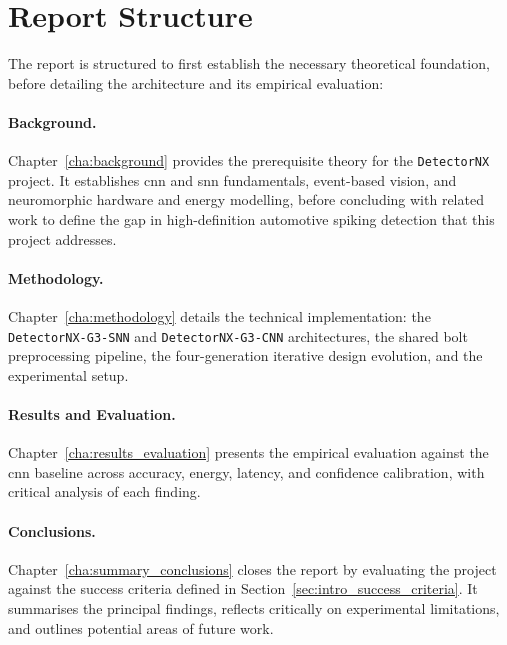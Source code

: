 \section{Report Structure}
\label{sec:intro_report_structure}

The report is structured to first establish the necessary theoretical foundation, before detailing the architecture and its empirical evaluation:

\paragraph{Background.}
\noindent Chapter~\ref{cha:background} provides the prerequisite theory for the \texttt{DetectorNX} project. It establishes \gls{cnn} and \gls{snn} fundamentals, event-based vision, and neuromorphic hardware and energy modelling, before concluding with related work to define the gap in high-definition automotive spiking detection that this project addresses.

\paragraph{Methodology.}
\noindent Chapter~\ref{cha:methodology} details the technical implementation: the \texttt{DetectorNX-G3-SNN} and \texttt{DetectorNX-G3-CNN} architectures, the shared \gls{bolt} preprocessing pipeline, the four-generation iterative design evolution, and the experimental setup.

\paragraph{Results and Evaluation.}
\noindent Chapter~\ref{cha:results_evaluation} presents the empirical evaluation against the \gls{cnn} baseline across accuracy, energy, latency, and confidence calibration, with critical analysis of each finding.

\paragraph{Conclusions.}
\noindent Chapter~\ref{cha:summary_conclusions} closes the report by evaluating the project against the success criteria defined in Section~\ref{sec:intro_success_criteria}. It summarises the principal findings, reflects critically on experimental limitations, and outlines potential areas of future work.
